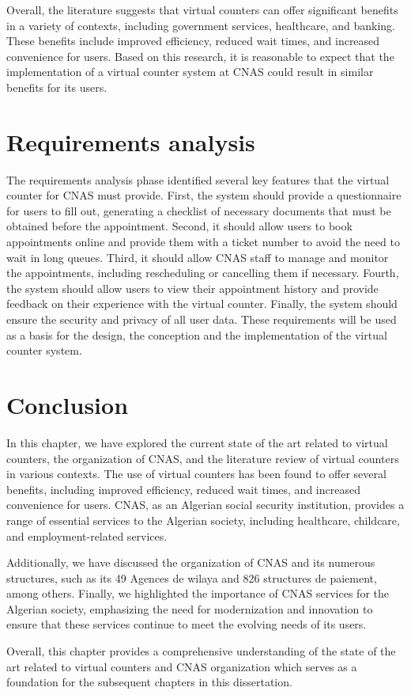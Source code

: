Overall, the literature suggests that virtual counters can offer significant benefits in a variety of contexts, including government services, healthcare, and banking. These benefits include improved efficiency, reduced wait times, and increased convenience for users. Based on this research, it is reasonable to expect that the implementation of a virtual counter system at CNAS could result in similar benefits for its users.

\section{Requirements analysis}
The requirements analysis phase identified several key features that the virtual counter for CNAS must provide. First, the system should provide a questionnaire for users to fill out, generating a checklist of necessary documents that must be obtained before the appointment. Second, it should allow users to book appointments online and provide them with a ticket number to avoid the need to wait in long queues. Third, it should allow CNAS staff to manage and monitor the appointments, including rescheduling or cancelling them if necessary. Fourth, the system should allow users to view their appointment history and provide feedback on their experience with the virtual counter. Finally, the system should ensure the security and privacy of all user data. These requirements will be used as a basis for the design, the conception and the implementation of the virtual counter system.

\section{Conclusion}
In this chapter, we have explored the current state of the art related to virtual counters, the organization of CNAS, and the literature review of virtual counters in various contexts. The use of virtual counters has been found to offer several benefits, including improved efficiency, reduced wait times, and increased convenience for users. CNAS, as an Algerian social security institution, provides a range of essential services to the Algerian society, including healthcare, childcare, and employment-related services.

Additionally, we have discussed the organization of CNAS and its numerous structures, such as its 49 Agences de wilaya and 826 structures de paiement, among others. Finally, we highlighted the importance of CNAS services for the Algerian society, emphasizing the need for modernization and innovation to ensure that these services continue to meet the evolving needs of its users.

Overall, this chapter provides a comprehensive understanding of the state of the art related to virtual counters and CNAS organization which serves as a foundation for the subsequent chapters in this dissertation.

